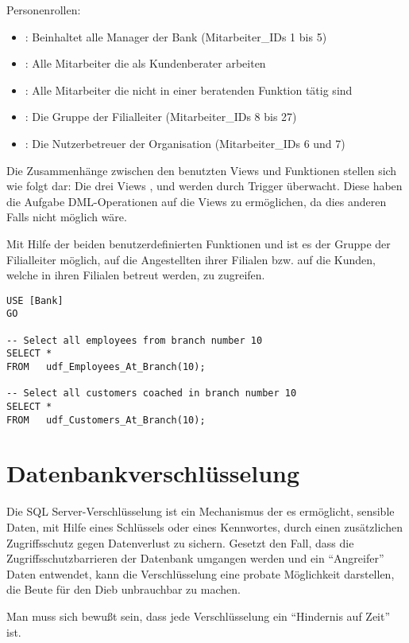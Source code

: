           Personenrollen:
          \begin{itemize}
            \item {}: Beinhaltet alle Manager der Bank
            (Mitarbeiter\_IDs 1 bis 5)
            \item {}: Alle Mitarbeiter die
            als Kundenberater arbeiten
            \item {}: Alle Mitarbeiter die nicht in
            einer beratenden Funktion tätig sind
            \item {}: Die Gruppe der
            Filialleiter (Mitarbeiter\_IDs 8 bis 27)
            \item {}: Die Nutzerbetreuer der
            Organisation (Mitarbeiter\_IDs 6 und 7)
          \end{itemize}
          Die Zusammenhänge zwischen den benutzten Views und Funktionen stellen
          sich wie folgt dar:
          Die drei Views , 
          und  werden durch Trigger überwacht.
          Diese haben die Aufgabe DML-Operationen auf die Views zu ermöglichen,
          da dies anderen Falls nicht möglich wäre.
          
          Mit Hilfe der beiden benutzerdefinierten Funktionen
           und
           ist es der Gruppe der
          Filialleiter möglich, auf die Angestellten ihrer Filialen bzw. auf die
          Kunden, welche in ihren Filialen betreut werden, zu zugreifen.
          \begin{lstlisting}[language=ms_sql,caption={Selektieren
          aus einer User Defined Table-function},label=sql19_25]
USE [Bank]
GO

-- Select all employees from branch number 10
SELECT *
FROM   udf_Employees_At_Branch(10);

-- Select all customers coached in branch number 10
SELECT *
FROM   udf_Customers_At_Branch(10);
          \end{lstlisting}
    \section{Datenbankverschlüsselung}
      Die SQL Server-Verschlüsselung ist ein Mechanismus der es ermöglicht,
      sensible Daten, mit Hilfe eines Schlüssels oder eines Kennwortes, durch
      einen zusätzlichen Zugriffsschutz gegen Datenverlust zu sichern. Gesetzt
      den Fall, dass die Zugriffsschutzbarrieren der Datenbank umgangen werden
      und ein \enquote{Angreifer} Daten entwendet, kann die Verschlüsselung eine
      probate Möglichkeit darstellen, die Beute für den Dieb unbrauchbar zu
      machen.
      \begin{merke}
        Man muss sich bewußt sein, dass jede Verschlüsselung
        ein \enquote{Hindernis auf Zeit} ist. 
      \end{merke}

